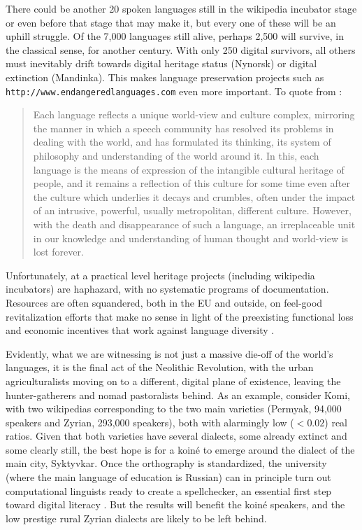 \documentclass[10pt]{article}
\begin{document}
There could be another 20 spoken languages still in the wikipedia incubator
stage or even before that stage that may make it, but every one of these will
be an uphill struggle.  Of the 7,000 languages still alive, perhaps 2,500 will
survive, in the classical sense, for another century. With only 250 digital
survivors, all others must inevitably drift towards digital heritage status
(Nynorsk) or digital extinction (Mandinka). This makes language preservation
projects such as {\tt http://www.endangeredlanguages.com} even more
important. To quote from \cite{UN_biodiv:2004}:

\begin{quote}
Each language reflects a unique world-view and culture complex, mirroring the
manner in which a speech community has resolved its problems in dealing with
the world, and has formulated its thinking, its system of philosophy and
understanding of the world around it.  In this, each language is the means of
expression of the intangible cultural heritage of people, and it remains a
reflection of this culture for some time even after the culture which
underlies it decays and crumbles, often under the impact of an intrusive,
powerful, usually metropolitan, different culture.  However, with the death
and disappearance of such a language, an irreplaceable unit in our knowledge
and understanding of human thought and world-view is lost forever.
\end{quote}

\noindent
Unfortunately, at a practical level heritage projects (including wikipedia
incubators) are haphazard, with no systematic programs of
documentation. Resources are often squandered, both in the EU and outside, on
feel-good revitalization efforts that make no sense in light of the
preexisting functional loss and economic incentives that work against language
diversity \cite{Ginsburgh:2011}.

Evidently, what we are witnessing is not just a massive die-off of the
world's languages, it is the final act of the Neolithic Revolution, with the
urban agriculturalists moving on to a different, digital plane of existence,
leaving the hunter-gatherers and nomad pastoralists behind. As an example,
consider Komi, with two wikipedias corresponding to the two main varieties
(Permyak, 94,000 speakers and Zyrian, 293,000 speakers), both with alarmingly
low ($< 0.02$) real ratios. Given that both varieties have several dialects,
some already extinct and some clearly {\color{black} still}, the best hope is for a koin\'e to
emerge around the dialect of the main city, Syktyvkar. Once the orthography is
standardized, the university (where the main language of education is Russian)
can in principle turn out computational linguists ready to create a
spellchecker, an essential first step toward digital literacy \cite{Proszeky:2005}.
But the results will benefit the koin\'e speakers, and the
low prestige rural Zyrian dialects are likely to be left behind.
\end{document}
